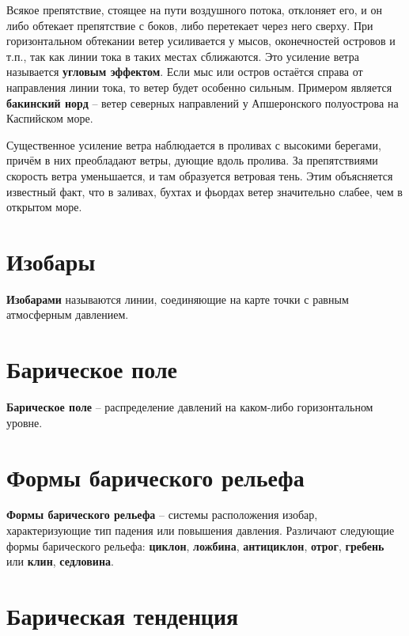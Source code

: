 \documentclass[a4paper, 12pt, twoside, final, book, russian, fittopage, cyremdash, openright]{ncc}
\begin{document}
Всякое препятствие, стоящее на пути воздушного потока, отклоняет его,
и он либо обтекает препятствие с боков, либо перетекает через него
сверху. При горизонтальном обтекании ветер усиливается у мысов,
оконечностей островов и т.п., так как линии тока в таких местах
сближаются. Это усиление ветра называется \textbf{угловым
  эффектом}. Если мыс или остров остаётся справа
от направления линии тока, то ветер будет особенно сильным. Примером
является \textbf{бакинский норд} \--- ветер
северных направлений у Апшеронского полуострова на Каспийском море.

Существенное усиление ветра наблюдается в проливах с высокими
берегами, причём в них преобладают ветры, дующие вдоль пролива.  За
препятствиями скорость ветра уменьшается, и там образуется ветровая
тень. Этим объясняется известный факт, что в заливах, бухтах и фьордах
ветер значительно слабее, чем в открытом море.

\section{Изобары}
\label{sec:isobars}

\textbf{Изобарами} называются линии, соединяющие на карте точки с равным атмосферным давлением.

\section{Барическое поле}
\label{sec:baric_field}

\textbf{Барическое поле} \--- распределение давлений на каком-либо горизонтальном уровне.

\section{Формы барического рельефа}
\label{sec:baric_relief}

\textbf{Формы барического рельефа}
\--- системы расположения изобар, характеризующие тип падения или
повышения давления. Различают следующие формы барического рельефа:
\textbf{циклон}, \textbf{ложбина}, \textbf{антициклон},
\textbf{отрог}, \textbf{гребень} или \textbf{клин},
\textbf{седловина}.

\section{Барическая тенденция}
\label{sec:baric_tendency}
\end{document}

